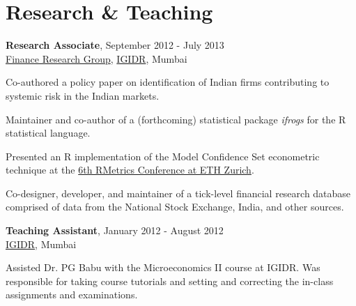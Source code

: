 \documentclass[a4paper,10pt]{article}
\renewenvironment{itemize}{
\begin{list}{}{
  \setlength{\leftmargin}{1.5em}
  }
  }{
\end{list}
}
\begin{document}
\section*{Research \& Teaching}
\begin{itemize}
  \item \textbf{Research Associate}, September 2012 - July 2013 \\
    \href{http://ifrogs.org}{Finance Research Group},
    \href{http://www.igidr.ac.in}{IGIDR}, Mumbai
    \small
      \begin{itemize}
        \item Co-authored a policy paper on identification of Indian firms
          contributing to systemic risk in the Indian markets.
        \item Maintainer and co-author of a (forthcoming) statistical
          package \emph{ifrogs} for the R statistical language.
        \item Presented an R implementation of the Model Confidence Set
          econometric technique at the
          \href{https://www.rmetrics.org/meielisalp2012}{6th RMetrics Conference
          at ETH Zurich}.
        \item Co-designer, developer, and maintainer of a tick-level
          financial research database comprised of data from the National
          Stock Exchange, India, and other sources.
      \end{itemize}
    \normalsize
  \item \textbf{Teaching Assistant}, January 2012 - August 2012 \\
    \href{http://www.igidr.ac.in}{IGIDR}, Mumbai
    \small
      \begin{itemize}
        \item Assisted Dr. PG Babu with the Microeconomics II course at IGIDR.
          Was responsible for taking course tutorials and setting and
          correcting the in-class assignments and examinations.
      \end{itemize}
    \normalsize
\end{itemize}
\end{document}
